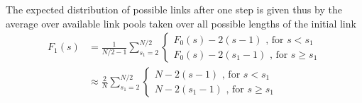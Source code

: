 \documentclass[
reprint,
twocolumn,
amsmath,amssymb,superscriptaddress,aps,
pre]{revtex4-1}
\begin{document}
The expected distribution of possible links after one step is given thus by the average over available link pools taken over all possible lengths of the initial link
\begin{align}
    F_1(s)&=\frac{1}{N/2-1} \sum_{s_1=2}^{N/2}{ \begin{cases}
    F_0(s)-2(s-1) \text{ , for } s<s_1\\
    F_0(s)-2(s_1 -1)\text{ , for } s\geq s_1
    \end{cases}}
    \nonumber \\
    &\approx\frac{2}{N} \sum_{s_1=2}^{N/2} { \begin{cases}
    N-2(s-1) \text{ , for } s<s_1\\
    N-2(s_1 -1)\text{ , for } s\geq s_1
    \end{cases}}
\end{align}
\end{document}
